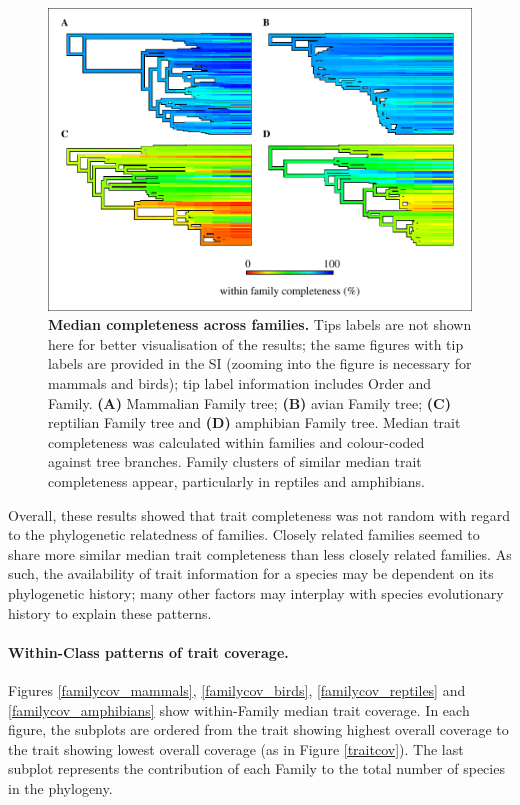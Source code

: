 \begin{figure}[h!]
\centering
\includegraphics[scale=0.75]{figures/chapter2/NA_phylo_patterns/Completeness_all}
\caption[Median completeness across families]{\textbf{Median completeness across families.} Tips labels are not shown here for better visualisation of the results; the same figures with tip labels are provided in the SI (zooming into the figure is necessary for mammals and birds); tip label information includes Order and Family. \textbf{(A)} Mammalian Family tree; \textbf{(B)} avian Family tree; \textbf{(C)} reptilian Family tree and \textbf{(D)} amphibian Family tree. Median trait completeness was calculated within families and colour-coded  against tree branches. Family clusters of similar median trait completeness appear, particularly in reptiles and amphibians.}
\label{classcomp}
\end{figure}

Overall, these results showed that trait completeness was not random with regard to the phylogenetic relatedness of families. Closely related families seemed to share more similar median trait completeness than less closely related families. As such, the availability of trait information for a species may be dependent on its phylogenetic history; many other factors may interplay with species evolutionary history to explain these patterns. 

\paragraph{Within-Class patterns of trait coverage.} Figures \ref{familycov_mammals}, \ref{familycov_birds}, \ref{familycov_reptiles} and \ref{familycov_amphibians} show within-Family median trait coverage. In each figure, the subplots are ordered from the trait showing highest overall coverage to the trait showing lowest overall coverage (as in Figure \ref{traitcov}). The last subplot represents the contribution of each Family to the total number of species in the phylogeny. 

